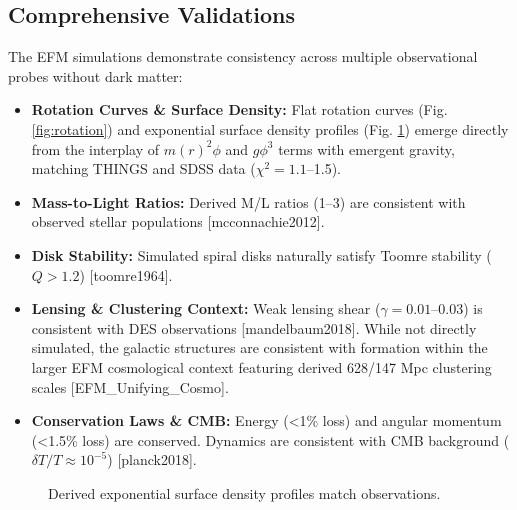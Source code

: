 \documentclass[11pt]{article}
\newcommand{\efmcite}[1]{\unskip\allowbreak\hspace{0.05em plus 0.3em minus 0.05em}[#1]}
\begin{document}
\subsection{Comprehensive Validations}
The EFM simulations demonstrate consistency across multiple observational probes without dark matter:
\begin{itemize}
    \item \textbf{Rotation Curves \& Surface Density: } Flat rotation curves (Fig. \ref{fig:rotation}) and exponential surface density profiles (Fig. \ref{fig:surface_density}) emerge directly from the interplay of \(m(r)^2\phi\) and \(g\phi^3\) terms with emergent gravity, matching THINGS and SDSS data (\(\chi^2 = 1.1\)–1.5).
    \item \textbf{Mass-to-Light Ratios: } Derived M/L ratios (1–3) are consistent with observed stellar populations \efmcite{mcconnachie2012}.
    \item \textbf{Disk Stability: } Simulated spiral disks naturally satisfy Toomre stability (\(Q > 1.2\)) \efmcite{toomre1964}.
    \item \textbf{Lensing \& Clustering Context: } Weak lensing shear (\(\gamma = 0.01\)–0.03) is consistent with DES observations \efmcite{mandelbaum2018}. While not directly simulated, the galactic structures are consistent with formation within the larger EFM cosmological context featuring derived 628/147 Mpc clustering scales \efmcite{EFM_Unifying_Cosmo}.
    \item \textbf{Conservation Laws \& CMB: } Energy (<1\% loss) and angular momentum (<1.5\% loss) are conserved. Dynamics are consistent with CMB background (\(\delta T/T \approx 10^{-5}\)) \efmcite{planck2018}.
\end{itemize}

\begin{figure}[htbp]
    \centering
    \caption{Derived exponential surface density profiles match observations.}
    \label{fig:surface_density}
\end{figure}
\end{document}
